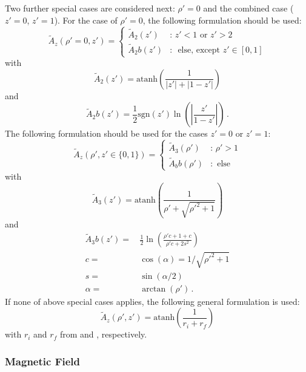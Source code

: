 Two further special cases are considered next: $\rho' = 0$ and the combined case ($z'=0$, $z'=1$).
For the case of $\rho'=0$, the following formulation should be used:
\begin{equation}
  \tilde{A}_z (\rho'=0, z')
  = \begin{cases}
      \tilde{A}_2(z')  &:\, z' < 1 \textrm{ or } z' > 2 \\
      \tilde{A}_2b(z') &:\, \textrm{ else, except } z' \in [0, 1]
    \end{cases}
\end{equation}
with
\begin{equation}
  \tilde{A}_2(z') = \textrm{atanh}\left( \frac{1}{|z'| + |1 - z'|} \right)
\end{equation}
and
\begin{equation}
  \tilde{A}_2b(z') = \frac{1}{2} \textrm{sgn}(z') \ln \left(\left| \frac{z'}{1-z'} \right| \right) \, .
\end{equation}
The following formulation should be used for the cases $z'=0$ or $z'=1$:
\begin{equation}
  \tilde{A}_z (\rho', z' \in \{0, 1\})
  = \begin{cases}
      \tilde{A}_3(\rho')  &:\, \rho' > 1 \\
      \tilde{A}_bb(\rho') &:\, \textrm{ else}
    \end{cases}
\end{equation}
with
\begin{equation}
  \tilde{A}_3(z') = \textrm{atanh}\left( \frac{1}{\rho' + \sqrt{{\rho'}^2 + 1}} \right)
\end{equation}
and
\begin{align}
  \tilde{A}_3b(z') =&\, \frac{1}{2} \ln \left(\frac{\rho' c + 1 + c}{\rho' c + 2 s^2 }\right) \\
  c =&\, \cos(\alpha) = 1 / \sqrt{{\rho'}^2 + 1} \\
  s =&\, \sin(\alpha/2)  \\
 \alpha =&\, \arctan(\rho') \, .
\end{align}
If none of above special cases applies,
the following general formulation is used:
\begin{equation}
  \tilde{A}_z (\rho', z') = \textrm{atanh}\left( \frac{1}{r_i + r_f} \right)
\end{equation}
with $r_i$ and $r_f$ from  and , respectively.

\subsubsection{Magnetic Field}


